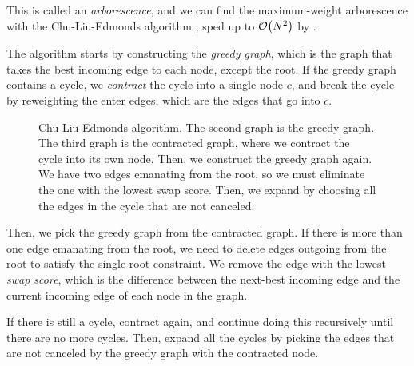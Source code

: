 This is called an \textit{arborescence}, and
we can find the maximum-weight arborescence with the Chu-Liu-Edmonds algorithm
\citep{chu1965shortest,edmonds1967optimum}, sped up to $\bigo{N^2}$ by
\citet{tarjan1977finding}.

The algorithm starts by constructing the \textit{greedy graph}, which is the
graph that takes the best incoming edge to each node, except the root. If the
greedy graph contains a cycle, we \textit{contract} the cycle into a single
node $c$, and break the cycle by reweighting the enter edges, which are the
edges that go into $c$.

\begin{figure*}[h!]
    \centering
    \caption{Chu-Liu-Edmonds algorithm. The second graph is the greedy graph.
        The third graph is the contracted graph, where we contract the cycle into
        its own node. Then, we construct the greedy graph again. We have two edges
        emanating from the root, so we must eliminate the one with the lowest swap
        score. Then, we expand by choosing all the edges in the cycle that are not
        canceled.}
    \label{fig:clu-greedy}
\end{figure*}

Then, we pick the greedy graph from the contracted graph. If there is more than
one edge emanating from the root, we need to delete edges outgoing from the root
to satisfy the single-root constraint. We remove the edge with the lowest
\textit{swap score}, which is the difference between the next-best incoming edge
and the current incoming edge of each node in the graph.

If there is still a cycle, contract again, and continue doing this recursively
until there are no more cycles. Then, expand all the cycles by picking the
edges that are not canceled by the greedy graph with the contracted node.
